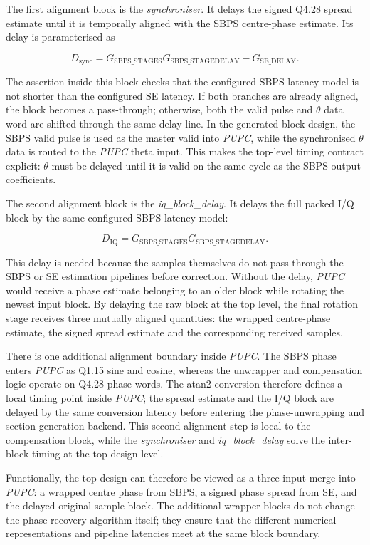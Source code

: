 The first alignment block is the \textit{synchroniser}. It delays the signed Q4.28 spread estimate until it is temporally aligned with the \ac{SBPS} centre-phase estimate. Its delay is parameterised as

\begin{equation}
    D_{\mathrm{sync}}
    =
    G_{\mathrm{SBPS\_STAGES}}G_{\mathrm{SBPS\_STAGEDELAY}}
    -
    G_{\mathrm{SE\_DELAY}} .
\end{equation}

The assertion inside this block checks that the configured \ac{SBPS} latency model is not shorter than the configured \ac{SE} latency. If both branches are already aligned, the block becomes a pass-through; otherwise, both the valid pulse and \(\theta\) data word are shifted through the same delay line. In the generated block design, the \ac{SBPS} valid pulse is used as the master valid into \textit{PUPC}, while the synchronised \(\theta\) data is routed to the \textit{PUPC} theta input. This makes the top-level timing contract explicit: \(\theta\) must be delayed until it is valid on the same cycle as the \ac{SBPS} output coefficients.

The second alignment block is the \textit{iq\_block\_delay}. It delays the full packed I/Q block by the same configured \ac{SBPS} latency model:

\begin{equation}
    D_{\mathrm{IQ}}
    =
    G_{\mathrm{SBPS\_STAGES}}G_{\mathrm{SBPS\_STAGEDELAY}} .
\end{equation}

This delay is needed because the samples themselves do not pass through the \ac{SBPS} or \ac{SE} estimation pipelines before correction. Without the delay, \textit{PUPC} would receive a phase estimate belonging to an older block while rotating the newest input block. By delaying the raw block at the top level, the final rotation stage receives three mutually aligned quantities: the wrapped centre-phase estimate, the signed spread estimate and the corresponding received samples.

There is one additional alignment boundary inside \textit{PUPC}. The \ac{SBPS} phase enters \textit{PUPC} as Q1.15 sine and cosine, whereas the unwrapper and compensation logic operate on Q4.28 phase words. The atan2 conversion therefore defines a local timing point inside \textit{PUPC}; the spread estimate and the I/Q block are delayed by the same conversion latency before entering the phase-unwrapping and section-generation backend. This second alignment step is local to the compensation block, while the \textit{synchroniser} and \textit{iq\_block\_delay} solve the inter-block timing at the top-design level.

Functionally, the top design can therefore be viewed as a three-input merge into \textit{PUPC}: a wrapped centre phase from \ac{SBPS}, a signed phase spread from \ac{SE}, and the delayed original sample block. The additional wrapper blocks do not change the phase-recovery algorithm itself; they ensure that the different numerical representations and pipeline latencies meet at the same block boundary.


